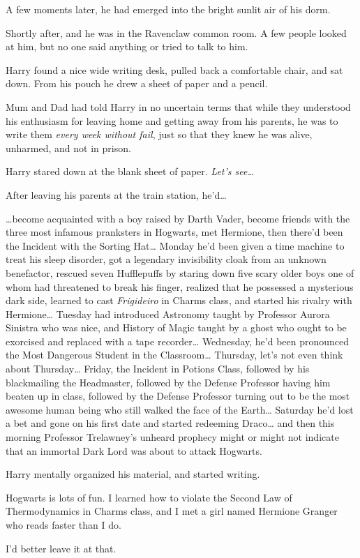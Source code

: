 A few moments later, he had emerged into the bright sunlit air of his dorm.

Shortly after, and he was in the Ravenclaw common room. A few people looked at him, but no one said anything or tried to talk to him.

Harry found a nice wide writing desk, pulled back a comfortable chair, and sat down. From his pouch he drew a sheet of paper and a pencil.

Mum and Dad had told Harry in no uncertain terms that while they understood his enthusiasm for leaving home and getting away from his parents, he was to write them \emph{every week without fail}, just so that they knew he was alive, unharmed, and not in prison.

Harry stared down at the blank sheet of paper. \emph{Let's see{\ldots}}

After leaving his parents at the train station, he'd{\ldots}

{\ldots}become acquainted with a boy raised by Darth Vader, become friends with the three most infamous pranksters in Hogwarts, met Hermione, then there'd been the Incident with the Sorting Hat{\ldots} Monday he'd been given a time machine to treat his sleep disorder, got a legendary invisibility cloak from an unknown benefactor, rescued seven Hufflepuffs by staring down five scary older boys one of whom had threatened to break his finger, realized that he possessed a mysterious dark side, learned to cast \emph{Frigideiro} in Charms class, and started his rivalry with Hermione{\ldots} Tuesday had introduced Astronomy taught by Professor Aurora Sinistra who was nice, and History of Magic taught by a ghost who ought to be exorcised and replaced with a tape recorder{\ldots} Wednesday, he'd been pronounced the Most Dangerous Student in the Classroom{\ldots} Thursday, let's not even think about Thursday{\ldots} Friday, the Incident in Potions Class, followed by his blackmailing the Headmaster, followed by the Defense Professor having him beaten up in class, followed by the Defense Professor turning out to be the most awesome human being who still walked the face of the Earth{\ldots} Saturday he'd lost a bet and gone on his first date and started redeeming Draco{\ldots} and then this morning Professor Trelawney's unheard prophecy might or might not indicate that an immortal Dark Lord was about to attack Hogwarts.

Harry mentally organized his material, and started writing.

\begin{writtenNote}

Hogwarts is lots of fun. I learned how to violate the Second Law of Thermodynamics in Charms class, and I met a girl named Hermione Granger who reads faster than I do.

I'd better leave it at that.

\end{writtenNote}


